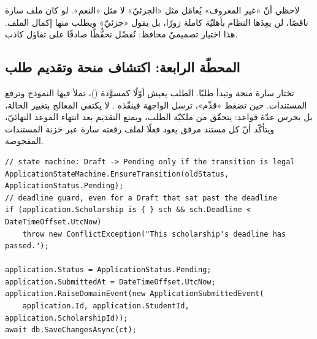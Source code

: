 \begin{center}
\begin{LTR}
\end{LTR}
\end{center}

\begin{keyp}
لاحظي أنّ «غير المعروف» يُعامَل مثل «الجزئيّ» لا مثل «النعم». لو كان ملف سارة ناقصًا،
لن يعِدَها النظام بأهليّة كاملة زورًا، بل يقول «جزئيّ» ويطلب منها إكمال الملف. هذا
اختيار تصميميّ محافظ: نُفضّل تحفُّظًا صادقًا على تفاؤل كاذب.
\end{keyp}

\subsection{المحطّة الرابعة: اكتشاف منحة وتقديم طلب}

تختار سارة منحة وتبدأ طلبًا. الطلب يعيش أوّلًا كمسوَّدة ()، تملأ فيها
النموذج وترفع المستندات. حين تضغط «قدِّم»، ترسل الواجهة 
فينفّذه . لا يكتفي المعالج بتغيير الحالة، بل
يحرس عدّة قواعد: يتحقّق من ملكيّة الطلب، ويمنع التقديم بعد انتهاء الموعد النهائيّ،
ويتأكّد أنّ كل مستند مرفق يعود فعلًا لملف رفعته سارة عبر خزنة المستندات المفحوصة.

\begin{english}
\begin{lstlisting}[language={[Sharp]C}]
// state machine: Draft -> Pending only if the transition is legal
ApplicationStateMachine.EnsureTransition(oldStatus, ApplicationStatus.Pending);
// deadline guard, even for a Draft that sat past the deadline
if (application.Scholarship is { } sch && sch.Deadline < DateTimeOffset.UtcNow)
    throw new ConflictException("This scholarship's deadline has passed.");

application.Status = ApplicationStatus.Pending;
application.SubmittedAt = DateTimeOffset.UtcNow;
application.RaiseDomainEvent(new ApplicationSubmittedEvent(
    application.Id, application.StudentId, application.ScholarshipId));
await db.SaveChangesAsync(ct);
\end{lstlisting}
\end{english}

